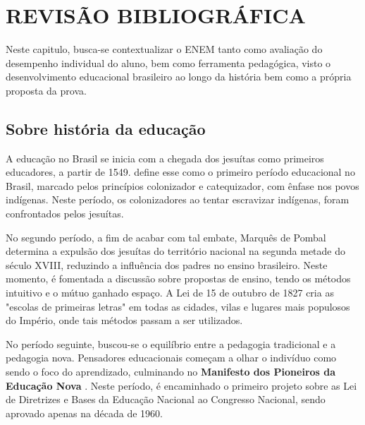 	\chapter{REVISÃO BIBLIOGRÁFICA}

	Neste capitulo, busca-se contextualizar o ENEM tanto como avaliação do desempenho individual do aluno, bem como ferramenta pedagógica, visto o desenvolvimento educacional brasileiro ao longo da história bem como a própria proposta da prova.

	\section{Sobre história da educação}

	A educação no Brasil se inicia com a chegada dos jesuítas como primeiros educadores, a partir de 1549.  define esse como o primeiro período educacional no Brasil, marcado pelos princípios colonizador e catequizador, com ênfase nos povos indígenas. Neste período, os colonizadores ao tentar escravizar indígenas, foram confrontados pelos jesuítas.

	No segundo período, a fim de acabar com tal embate, Marquês de Pombal determina a expulsão dos jesuítas do território nacional na segunda metade do século XVIII, reduzindo a influência dos padres no ensino brasileiro. Neste momento, é fomentada a discussão sobre propostas de ensino, tendo os métodos intuitivo e o mútuo ganhado espaço. A Lei de 15 de outubro de 1827 cria as "escolas de primeiras letras" em todas as cidades, vilas e lugares mais populosos do Império, onde tais métodos passam a ser utilizados.

	No período seguinte, buscou-se o equilíbrio entre a pedagogia tradicional e a pedagogia nova. Pensadores educacionais começam a olhar o indivíduo como sendo o foco do aprendizado, culminando no \textbf{Manifesto dos Pioneiros da Educação Nova} . Neste período, é encaminhado o primeiro projeto sobre as Lei de Diretrizes e Bases da Educação Nacional ao Congresso Nacional, sendo aprovado apenas na década de 1960.


